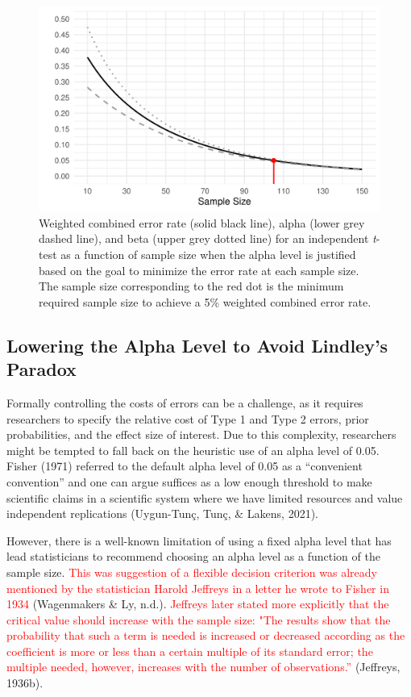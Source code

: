 \documentclass[
  english,
  ,man, a4paper,floatsintext]{apa6}
\begin{document}
\begin{figure}
\centering
\includegraphics{Justify_in_Practice_files/figure-latex/error-plot-1.pdf}
\caption{\label{fig:error-plot}Weighted combined error rate (solid black line), alpha (lower grey dashed line), and beta (upper grey dotted line) for an independent \emph{t}-test as a function of sample size when the alpha level is justified based on the goal to minimize the error rate at each sample size. The sample size corresponding to the red dot is the minimum required sample size to achieve a 5\% weighted combined error rate.}
\end{figure}

\hypertarget{lowering-the-alpha-level-to-avoid-lindleys-paradox}{%
\subsection{Lowering the Alpha Level to Avoid Lindley's Paradox}\label{lowering-the-alpha-level-to-avoid-lindleys-paradox}}

Formally controlling the costs of errors can be a challenge, as it requires researchers to specify the relative cost of Type 1 and Type 2 errors, prior probabilities, and the effect size of interest. Due to this complexity, researchers might be tempted to fall back on the heuristic use of an alpha level of 0.05. Fisher (1971) referred to the default alpha level of 0.05 as a ``convenient convention'' and one can argue suffices as a low enough threshold to make scientific claims in a scientific system where we have limited resources and value independent replications (Uygun-Tunç, Tunç, \& Lakens, 2021).

However, there is a well-known limitation of using a fixed alpha level that has lead statisticians to recommend choosing an alpha level as a function of the sample size.
\textcolor{red}{This was suggestion of a flexible decision criterion was already mentioned by the statistician Harold Jeffreys in a letter he wrote to Fisher in 1934} (Wagenmakers \& Ly, n.d.). \textcolor{red}{Jeffreys later stated more explicitly that the critical value should increase with the sample size: "The results show that the probability that such a term is needed is increased or decreased according as the coefficient is more or less than a certain multiple of its standard error; the multiple needed, however, increases with the number of observations.”} (Jeffreys, 1936b).
\end{document}
